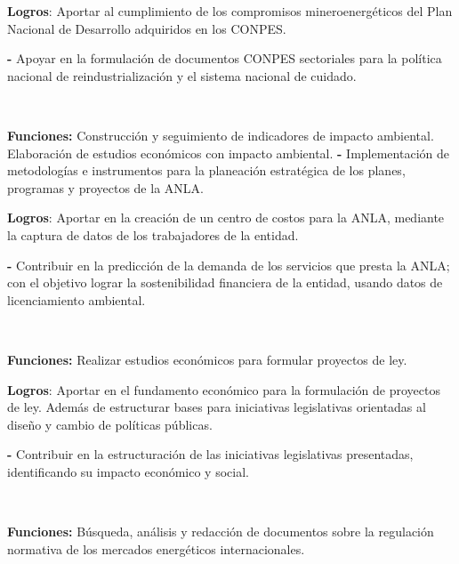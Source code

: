\documentclass[theme]{cv_einstein}
\begin{document}
\begin{paracol}{2}
\begin{rightcolumn}
{            \textbf{Logros}:
            Aportar al cumplimiento de los compromisos mineroenergéticos del Plan Nacional de Desarrollo adquiridos en los CONPES.
            
            \textbf{-} Apoyar en la formulación de documentos CONPES sectoriales para la política nacional de reindustrialización y el sistema nacional de cuidado.}
            \vspace{0.7mm}\\
            {\textbf{Funciones:} Construcción y seguimiento de indicadores de impacto ambiental. Elaboración de estudios económicos con impacto ambiental.\hspace{70.0mm} \textbf{-} Implementación de metodologías e instrumentos para la planeación estratégica de los planes, programas y proyectos de la ANLA.
            
            \textbf{Logros}:
            Aportar en la creación de un centro de costos para la ANLA,
            mediante la captura de datos de los trabajadores de la entidad.
            
            \textbf{-} Contribuir en la predicción de la demanda de los servicios que presta la ANLA; con el objetivo lograr la sostenibilidad financiera de la entidad, usando datos de licenciamiento ambiental.}
            \vspace{0.7mm}\\
            {\textbf{Funciones:} Realizar estudios económicos para formular proyectos de ley.   
            
            \textbf{Logros}: 
            Aportar en el fundamento económico para la formulación de proyectos de ley. Además de estructurar bases para iniciativas legislativas orientadas al diseño y cambio de políticas públicas.
            
            \textbf{-} Contribuir en la estructuración de las iniciativas legislativas presentadas, identificando su impacto económico y social.}
            \vspace{0.7mm}\\
            {\textbf{Funciones:} Búsqueda, análisis y redacción de documentos sobre la regulación normativa de los mercados energéticos internacionales.  
            
}
\end{rightcolumn}
\end{paracol}
\end{document}
